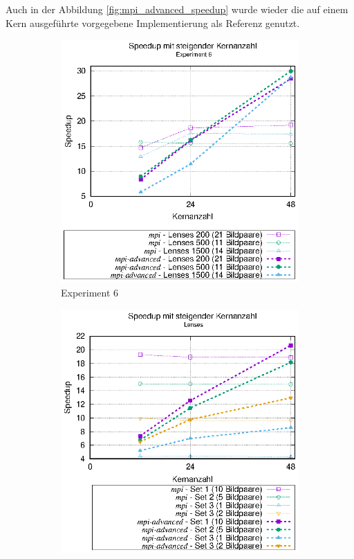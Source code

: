 Auch in der Abbildung \ref{fig:mpi_advanced_speedup} wurde wieder die auf einem Kern ausgeführte vorgegebene Implementierung als Referenz genutzt. 

\begin{center}
	\begin{figure}[htbp]
		\begin{subfigure}[b]{0.45\textwidth}
			\centering
			\includegraphics[width=\textwidth]{pdf/mpi_advanced_speedup_exp6}
			\caption{Experiment 6}
			\label{fig:mpi_advanced_speedup_exp6}
		\end{subfigure}
	\hfill
		\begin{subfigure}[b]{0.45\textwidth}
			\centering
			\includegraphics[width=\textwidth]{pdf/mpi_advanced_speedup_lenses}

\end{subfigure}
\end{figure}
\end{center}
